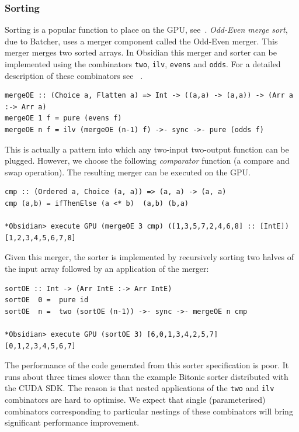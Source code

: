 \subsubsection{Sorting}

Sorting is a popular function to place on the GPU, see~\cite{SORT1,SORT3}.
{\em Odd-Even merge sort}, due to Batcher, uses a merger component called the Odd-Even merger. This 
merger merges two sorted arrays. In Obsidian this merger and sorter 
can be implemented using the combinators {\tt two}, {\tt ilv}, {\tt evens}
and {\tt odds}. For a detailed description of these combinators see
~\cite{LAVASORTER}.

\begin{small}
\begin{verbatim}
mergeOE :: (Choice a, Flatten a) => Int -> ((a,a) -> (a,a)) -> (Arr a :-> Arr a)
mergeOE 1 f = pure (evens f)
mergeOE n f = ilv (mergeOE (n-1) f) ->- sync ->- pure (odds f)
\end{verbatim}
\end{small}
\noindent
This is actually a pattern into which any two-input two-output function
can be plugged. However, we choose the following {\em comparator} function (a compare and swap operation). The resulting merger can be executed on the GPU.
\begin{small}
\begin{verbatim}
cmp :: (Ordered a, Choice (a, a)) => (a, a) -> (a, a)
cmp (a,b) = ifThenElse (a <* b)  (a,b) (b,a)

*Obsidian> execute GPU (mergeOE 3 cmp) ([1,3,5,7,2,4,6,8] :: [IntE]) 
[1,2,3,4,5,6,7,8]
\end{verbatim}
\end{small}
\noindent
Given this merger, the sorter is implemented by recursively sorting 
two halves of the input array followed by an application of the merger:

\begin{small}
\begin{verbatim}
sortOE :: Int -> (Arr IntE :-> Arr IntE)
sortOE  0 =  pure id
sortOE  n =  two (sortOE (n-1)) ->- sync ->- mergeOE n cmp 

*Obsidian> execute GPU (sortOE 3) [6,0,1,3,4,2,5,7]
[0,1,2,3,4,5,6,7]
\end{verbatim}
\end{small}

The performance of the code generated from this sorter specification is poor. It
runs about three times slower than the example Bitonic
sorter distributed with the CUDA SDK. 
The reason is that nested applications of the {\tt two} and {\tt ilv} 
combinators are hard to optimise. We expect that single (parameterised) combinators corresponding
to particular nestings of these combinators will bring significant performance improvement.
%


